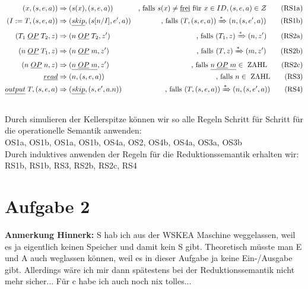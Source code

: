 \documentclass[ngerman,a4paper]{report}
\begin{document}
\begin{align}
(x,(s,e,a)) &\Rightarrow (s(x), (s,e,a))&\text{, falls }s(x) \neq \text{\underline{frei}}\text{ für }x \in ID, (s,e,a) \in \mathcal{Z}\tag{RS1a}\\
(I:=T,(s,e,a)) &\Rightarrow (\underline{skip}, (s[n/I],e',a))&\text{, falls }(T, (s,e,a))\xRightarrow{*}(n,(s,e',a))\tag{RS1b}\\
(T_1\;\underline{OP}\;T_2, z) &\Rightarrow (n\;\underline{OP}\;T_2, z')&\text{, falls }(T_1, z) \xRightarrow{*}(n,z')\tag{RS2a}\\
(n\;\underline{OP}\;T_1, z) &\Rightarrow (n\;\underline{OP}\;m, z')&\text{, falls }(T, z) \xRightarrow{*}(m,z')\tag{RS2b}\\
(n\;\underline{OP}\;n, z) &\Rightarrow (\underline{n\;\underline{OP}\;m}, z')&\text{, falls }\underline{n\;\underline{OP}\;m} \in\text{ ZAHL}\tag{RS2c}\\
\underline{read} &\Rightarrow (n, (s,e,a))&\text{, falls } n \in\text{ ZAHL}\tag{RS3}\\
\underline{output}\;T, (s,e,a) &\Rightarrow (\underline{skip}, (s,e',a.n))&\text{, falls }(T, (s,e,a))\xRightarrow{*}(n,(s,e',a))\tag{RS4}\\\notag
\end{align}
Durch simulieren der Kellerspitze können wir so alle Regeln Schritt für Schritt für die operationelle Semantik anwenden:\\
OS1a, OS1b, OS1a, OS1b, OS4a, OS2, OS4b, OS4a, OS3a, OS3b\\
Durch induktives anwenden der Regeln für die Reduktionssemantik erhalten wir:\\
RS1b, RS1b, RS3, RS2b, RS2c, RS4\\

\section*{Aufgabe 2}
\textbf{Anmerkung Hinnerk:} S hab ich aus der WSKEA Maschine weggelassen, weil es ja eigentlich keinen Speicher und damit kein S gibt. Theoretisch müsste man E und A auch weglassen können, weil es in dieser Aufgabe ja keine Ein-/Ausgabe gibt. Allerdings wäre ich mir dann spätestens bei der Reduktionssemantik nicht mehr sicher...
Für c habe ich auch noch nix tolles...
\end{document}
